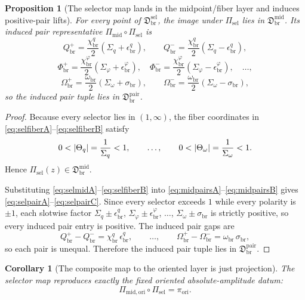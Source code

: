 \documentclass[11pt]{article}
\newcommand{\AbsReadAmp}{\chi_{\mathrm{br}}^{q}}
\newcommand{\AbsCovAmp}{\chi_{\mathrm{br}}^{\varphi}}
\newcommand{\AbsScaleAmp}{\omega_{\mathrm{br}}}
\newcommand{\PolRead}{\epsilon_{\mathrm{br}}^{q}}
\newcommand{\PolCov}{\epsilon_{\mathrm{br}}^{\varphi}}
\newcommand{\PolScale}{\sigma_{\mathrm{br}}}
\newcommand{\PairSector}{\mathfrak D_{\mathrm{br}}^{\mathrm{pair}}}
\newcommand{\PairReadPlus}{Q_{\mathrm{br}}^{+}}
\newcommand{\PairReadMinus}{Q_{\mathrm{br}}^{-}}
\newcommand{\PairCovPlus}{\Phi_{\mathrm{br}}^{+}}
\newcommand{\PairCovMinus}{\Phi_{\mathrm{br}}^{-}}
\newcommand{\PairScalePlus}{\Omega_{\mathrm{br}}^{+}}
\newcommand{\PairScaleMinus}{\Omega_{\mathrm{br}}^{-}}
\newcommand{\MidFiberSector}{\mathfrak D_{\mathrm{br}}^{\mathrm{mid}}}
\newcommand{\MidPairMap}{\Pi_{\mathrm{mid}}}
\newcommand{\MidOriginMap}{\Pi_{\mathrm{mid,ori}}}
\newcommand{\FiberRead}{\Theta_{q}}
\newcommand{\FiberScale}{\Theta_{\omega}}
\newcommand{\MidSelSector}{\mathfrak D_{\mathrm{br}}^{\mathrm{sel}}}
\newcommand{\MidSelMap}{\Pi_{\mathrm{sel}}}
\newcommand{\SelProj}{\pi_{\mathrm{ori}}}
\newcommand{\SelRead}{\Sigma_{q}}
\newcommand{\SelCov}{\Sigma_{\varphi}}
\newcommand{\SelScale}{\Sigma_{\omega}}
\newtheorem{proposition}{Proposition}
\newtheorem{corollary}{Corollary}
\begin{document}
\begin{proposition}[The selector map lands in the midpoint/fiber layer and induces positive-pair lifts]
\label{prop:sellands}
For every point of \(\MidSelSector\), the image under \(\MidSelMap\) lies in \(\MidFiberSector\). Its induced pair representative \(\MidPairMap\circ\MidSelMap\) is
\begin{equation}
\PairReadPlus=\frac{\AbsReadAmp}{2}(\SelRead+\PolRead),
\qquad
\PairReadMinus=\frac{\AbsReadAmp}{2}(\SelRead-\PolRead),
\label{eq:selpairA}
\end{equation}
\begin{equation}
\PairCovPlus=\frac{\AbsCovAmp}{2}(\SelCov+\PolCov),
\quad
\PairCovMinus=\frac{\AbsCovAmp}{2}(\SelCov-\PolCov),
\quad
\ldots,
\label{eq:selpairB}
\end{equation}
\begin{equation}
\PairScalePlus=\frac{\AbsScaleAmp}{2}(\SelScale+\PolScale),
\qquad
\PairScaleMinus=\frac{\AbsScaleAmp}{2}(\SelScale-\PolScale),
\label{eq:selpairC}
\end{equation}
so the induced pair tuple lies in \(\PairSector\).
\end{proposition}

\begin{proof}
Because every selector lies in \((1,\infty)\), the fiber coordinates in \eqref{eq:selfiberA}--\eqref{eq:selfiberB} satisfy
\[
0<\abs{\FiberRead}=\frac{1}{\SelRead}<1,
\qquad
\ldots,
\qquad
0<\abs{\FiberScale}=\frac{1}{\SelScale}<1.
\]
Hence \(\MidSelMap(z)\in\MidFiberSector\).

Substituting \eqref{eq:selmidA}--\eqref{eq:selfiberB} into \eqref{eq:midpairsA}--\eqref{eq:midpairsB} gives \eqref{eq:selpairA}--\eqref{eq:selpairC}. Since every selector exceeds \(1\) while every polarity is \(\pm1\), each slotwise factor \(\SelRead\pm\PolRead\), \(\SelCov\pm\PolCov\), \(\ldots\), \(\SelScale\pm\PolScale\) is strictly positive, so every induced pair entry is positive. The induced pair gaps are
\[
\PairReadPlus-\PairReadMinus=\AbsReadAmp\,\PolRead,
\qquad
\ldots,
\qquad
\PairScalePlus-\PairScaleMinus=\AbsScaleAmp\,\PolScale,
\]
so each pair is unequal. Therefore the induced pair tuple lies in \(\PairSector\).
\end{proof}

\begin{corollary}[The composite map to the oriented layer is just projection]
\label{cor:selorigin}
The selector map reproduces exactly the fixed oriented absolute-amplitude datum:
\begin{equation}
\MidOriginMap\circ\MidSelMap=\SelProj.
\label{eq:selectorigin}
\end{equation}
\end{corollary}
\end{document}
